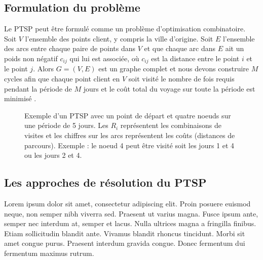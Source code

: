 \medskip

\subsection{Formulation du problème}
Le PTSP peut être formulé comme un problème d'optimisation combinatoire. Soit $V$ l'ensemble des points client, y compris la ville d'origine. Soit $E$ l'ensemble des arcs entre chaque paire de points dans $V$ et que chaque arc dans $E$ ait un poids non négatif $c_{ij}$ qui lui est associée, où $c_{ij}$ est la distance entre le point $i$ et le point $j$. Alors $G = (V, E)$ est un graphe complet et nous devons construire $M$ cycles afin que chaque point client en $V$ soit visité le nombre de fois requis pendant la période de $M$ jours et le coût total du voyage sur toute la période est minimisé \parencite{chao_new_1995}.


\begin{figure}[hbt!]
  \centering
  \caption{Exemple d'un PTSP avec un point de départ et quatre noeuds sur une période de 5 jours. Les $R_i$ représentent les combinaisons de visites et les chiffres sur les arcs représentent les coûts (distances de parcours). Exemple : le noeud 4 peut être visité soit les jours 1 et 4 ou les jours 2 et 4. }
  \label{fig:ptsp-first-example}
\end{figure}
\FloatBarrier



\subsection{Les approches de résolution du PTSP}
Lorem ipsum dolor sit amet, consectetur adipiscing elit. Proin posuere euismod neque, non semper nibh viverra sed. Praesent ut varius magna. Fusce ipsum ante, semper nec interdum at, semper et lacus. Nulla ultrices magna a fringilla finibus. Etiam sollicitudin blandit ante. Vivamus blandit rhoncus tincidunt. Morbi sit amet congue purus. Praesent interdum gravida congue. Donec fermentum dui fermentum maximus rutrum.

